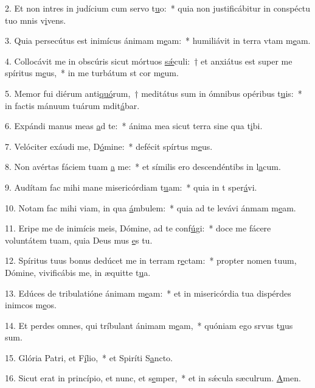 2. Et non intres in judícium cum servo t\uline{u}o:~* quia non justificábitur in conspéctu tuo mnis v\uline{i}vens.\par 
3. Quia persecútus est inimícus ánimam m\uline{e}am:~* humiliávit in terra vtam m\uline{e}am.\par 
4. Collocávit me in obscúris sicut mórtuos \uline{sǽ}culi:~† et anxiátus est super me spíritus m\uline{e}us,~* in me turbátum st cor m\uline{e}um.\par 
5. Memor fui diérum anti\uline{quó}rum,~† meditátus sum in ómnibus opéribus t\uline{u}is:~* in factis mánuum tuárum mdit\uline{á}bar.\par 
6. Expándi manus meas \uline{a}d te:~* ánima mea sicut terra sine qua t\uline{i}bi.\par 
7. Velóciter exáudi me, D\uline{ó}mine:~* defécit spírtus m\uline{e}us.\par 
8. Non avértas fáciem tuam \uline{a} me:~* et símilis ero descendéntibs in l\uline{a}cum.\par 
9. Audítam fac mihi mane misericórdiam t\uline{u}am:~* quia in t sper\uline{á}vi.\par 
10. Notam fac mihi viam, in qua \uline{á}mbulem:~* quia ad te levávi ánmam m\uline{e}am.\par 
11. Eripe me de inimícis meis, Dómine, ad te conf\uline{ú}gi:~* doce me fácere voluntátem tuam, quia Deus mus \uline{e}s tu.\par 
12. Spíritus tuus bonus dedúcet me in terram r\uline{e}ctam:~* propter nomen tuum, Dómine, vivificábis me, in æquitte t\uline{u}a.\par 
13. Edúces de tribulatióne ánimam m\uline{e}am:~* et in misericórdia tua dispérdes inimcos m\uline{e}os.\par 
14. Et perdes omnes, qui tríbulant ánimam m\uline{e}am,~* quóniam ego srvus t\uline{u}us sum.\par 
15. Glória Patri, et F\uline{í}lio,~* et Spiríti S\uline{a}ncto.\par 
16. Sicut erat in princípio, et nunc, et s\uline{e}mper,~* et in sǽcula sæculrum. \uline{A}men.\par 
